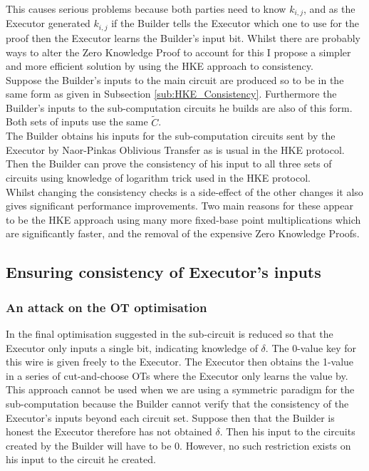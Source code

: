 \documentclass[ %
                    author={Nicholas Tutte},
                supervisor={Prof. Nigel Smart},
                    degree={MEng},
                     title={Secure Two Party Computation},
                  subtitle={A practical comparison of recent protocols},
                      type={Research - GG1K},
                      year={2015} ]{dissertation}
\begin{document}
				This causes serious problems because both parties need to know $k_{i,j}$, and as the Executor generated $k_{i,j}$ if the Builder tells the Executor which one to use for the proof then the Executor learns the Builder's input bit. Whilst there are probably ways to alter the Zero Knowledge Proof to account for this I propose a simpler and more efficient solution by using the HKE approach to consistency.\\

				Suppose the Builder's inputs to the main circuit are produced so to be in the same form as given in Subsection \ref{sub:HKE_Consistency}. Furthermore the Builder's inputs to the sub-computation circuits he builds are also of this form. Both sets of inputs use the same $\tilde C$.\\

				The Builder obtains his inputs for the sub-computation circuits sent by the Executor by Naor-Pinkas Oblivious Transfer as is usual in the HKE protocol. Then the Builder can prove the consistency of his input to all three sets of circuits using knowledge of logarithm trick used in the HKE protocol.\\

				Whilst changing the consistency checks is a side-effect of the other changes it also gives significant performance improvements. Two main reasons for these appear to be the HKE approach using many more fixed-base point multiplications which are significantly faster, and the removal of the expensive Zero Knowledge Proofs.\\

			\subsection{Ensuring consistency of Executor's inputs}
				\subsubsection{An attack on the OT optimisation}
					In the final optimisation suggested in \cite{Lindell_CnC_2013} the sub-circuit is reduced so that the Executor only inputs a single bit, indicating knowledge of $\delta$. The 0-value key for this wire is given freely to the Executor. The Executor then obtains the 1-value in a series of cut-and-choose OTs where the Executor only learns the value by.\\

					This approach cannot be used when we are using a symmetric paradigm for the sub-computation because the Builder cannot verify that the consistency of the Executor's inputs beyond each circuit set. Suppose then that the Builder is honest the Executor therefore has not obtained $\delta$. Then his input to the circuits created by the Builder will have to be $0$. However, no such restriction exists on his input to the circuit he created.\\
\end{document}
